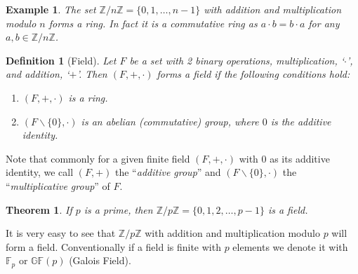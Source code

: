 \documentclass[12pt]{article}
\newtheorem{theorem}{Theorem}
\newtheorem{example}{Example}
\newtheorem{definition}{Definition}
\newcommand{\Zn}[1]{\mathds{Z}/#1\mathds{Z}}
\newcommand{\gf}[1]{\mathds{GF}\left(#1\right)} %
\begin{document}
\begin{example}
	The set $\Zn{n}=\{0,1,\ldots, n-1 \}$ with addition and multiplication modulo $n$ forms a ring. In fact it is a commutative ring as $a\cdot b=b\cdot a$ for any $a,b\in \Zn{n}$.
\end{example}

\begin{definition}[Field]
	Let $F$ be a set with 2 binary operations, multiplication, `$\cdot$', and addition, `$+$'. Then $(F,+,\cdot)$ forms a field if the following conditions hold:
	\begin{enumerate}
		\item  $(F,+,\cdot)$ is a ring.
		\item  $(F\backslash\{0\},\cdot)$ is an abelian (commutative) group, where $0$ is the additive identity. 
	\end{enumerate}
\end{definition}

Note that commonly for a given finite field $(F,+,\cdot)$  with $0$ as its additive identity, we call $(F,+)$ the ``\textit{additive group}'' and $(F\backslash\{0\},\cdot)$ the ``\textit{multiplicative group}'' of $F$. 

\begin{theorem}
	If $p$ is a prime, then $\Zn{p}=\{0,1,2,\ldots, p-1 \}$ is a field.
\end{theorem}

It is very easy to see that $\Zn{p}$ with addition and multiplication modulo $p$ will form a field. Conventionally if a field is finite with $p$ elements we denote it with $\mathds{F}_p$ or $\gf{p}$ (Galois Field). 
\end{document}
